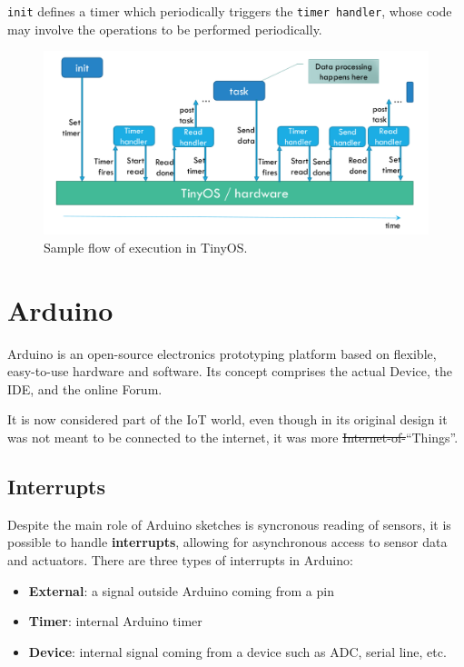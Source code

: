 \texttt{init} defines a timer which periodically triggers the \texttt{timer handler}, whose code may involve the operations to be performed periodically.

\begin{figure}[htbp]
   \centering
   \includegraphics{images/tinyos_model.png}
   \caption{Sample flow of execution in TinyOS.}
   \label{fig:tinyos_model}
\end{figure}

\section{Arduino}

Arduino is an open-source electronics prototyping platform based on flexible, easy-to-use hardware and software. Its concept comprises the actual Device, the IDE, and the online Forum.

It is now considered part of the IoT world, even though in its original design it was not meant to be connected to the internet, it was more \st{Internet-of-}``Things''.


\subsection{Interrupts}
Despite the main role of Arduino sketches is syncronous reading of sensors, it is possible to handle \textbf{interrupts}, allowing for asynchronous access to sensor data and actuators.
There are three types of interrupts in Arduino:
\begin{itemize}
   \item \textbf{External}:
   a signal outside Arduino coming from a pin
   \item \textbf{Timer}:
   internal Arduino timer 
   \item \textbf{Device}:
   internal signal coming from a device such as ADC, serial line, etc.
\end{itemize}

